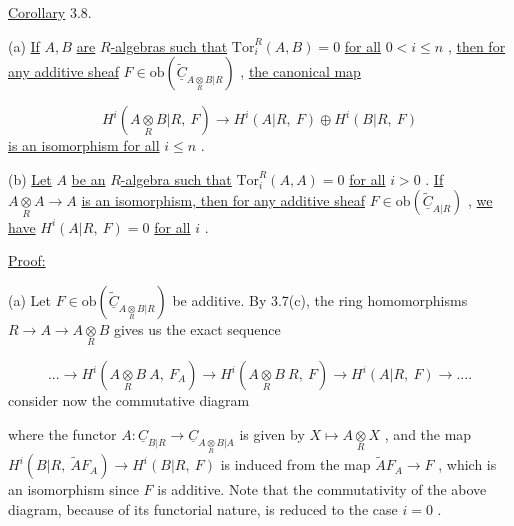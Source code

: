 \underline{Corollary} 3.8.

(a)  \underline{If}  $A, B$  \underline{are} $R$\underline{-algebras such that}  $\mathrm{Tor}^{R}_{i}(A, B) = 0$  \underline{for all} $0 < i \leq n$  , \underline{then for any additive sheaf}  $F \in \mathrm{ob}(\widetilde{\underline{C}}_{A\underset{R}{\otimes}B|R})$  , \underline{the canonical map}

\begin{equation*}
H^{i}(A\underset{R}{\otimes}B|R,\ F) \rightarrow H^{i}(A|R,\ F) \oplus H^{i}(B|R,\ F)
\end{equation*}
\underline{is an isomorphism for all}  $i \leq n$  .

(b)  \underline{Let}  $A$  \underline{be an} $R$\underline{-algebra such that}  $\mathrm{Tor}^{R}_{i}(A, A) = 0$  \underline{for all}  $i > 0$  . \underline{If}  $A\underset{R}{\otimes}A \rightarrow A$  \underline{is an isomorphism, then for any additive sheaf}  $F \in \mathrm{ob}(\widetilde{\underline{C}}_{A|R})$  , \underline{we have}  $H^{i}(A|R,\ F) = 0$  \underline{for all}  $i$  .


\underline{Proof:}

(a)  Let  $F \in \mathrm{ob}(\widetilde{\underline{C}}_{A\underset{R}{\otimes}B|R})$  be additive. By 3.7(c), the ring homomorphisms $R \rightarrow A \rightarrow A\underset{R}{\otimes}B$  gives us the exact sequence

\begin{equation}\tag{*}
... \rightarrow H^{i}(A\underset{R}{\otimes}B\ A,\ F_{A}) \rightarrow H^{i}(A\underset{R}{\otimes}B\ R,\ F) \rightarrow H^{i}(A|R,\ F) \rightarrow ....
\end{equation}
consider now the commutative diagram

\begin{center}
\end{center}
where the functor  $A : \underline{C}_{B|R} \rightarrow \underline{C}_{A\underset{R}{\otimes}B|A}$  is given by  $X \longmapsto A\underset{R}{\otimes}X$  , and the map $H^{i}(B|R,\ \widetilde{A}F_{A}) \rightarrow H^{i}(B|R,\ F)$  is induced from the map  $\widetilde{A}F_{A} \rightarrow F$  , which is an isomorphism since  $F$  is additive.  Note that the commutativity of the above diagram, because of its functorial nature, is reduced to the case  $i = 0$  .

